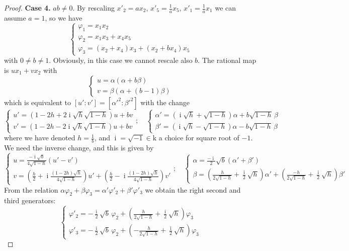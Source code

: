 \documentclass[10pt,reqno]{amsart}
\newcommand{\ii}{\operatorname{i}}
\renewcommand{\a}{\alpha}
\renewcommand{\b}{\beta}
\newcommand{\f}{\varphi}
\newcommand{\kk}{\mathrm{k}}
\theoremstyle{definition}
\begin{document}
\begin{proof}
\noindent \textbf{Case 4.} $ab\ne 0$. By rescaling $x'_2=a x_2$, $x'_5=\frac1a x_5$, $x'_1=\frac1ax_1$ we can assume $a=1$, so we have
\[
\begin{cases}
    \f_1=x_1x_2 \\
    \f_2=x_1x_3+x_4x_5 \\
    \f_3=(x_2+x_4)x_3+(x_2+bx_4)x_5
\end{cases}
\]
with $0 \ne b \ne 1$. Obviously, in this case we cannot rescale also $b$. The rational map is $ux_1+vx_2$ with 
\[
\begin{cases}
    u=\a (\a + b \b) \\
    v=\b(\a+(b-1)\b)
\end{cases}
\]
which is equivalent to $[u':v']=[\a'^2:\b'^2]$ with the change
\[
\begin{cases}
    u'=(1-2h+2 \ii \sqrt{h}\sqrt{1-h})u + b v \\
    v'=(1-2h-2 \ii \sqrt{h}\sqrt{1-h})u + b v
\end{cases} 
; \quad
\begin{cases}
    \a'=( \ii \sqrt{h} + \sqrt{1-h})\a + b\sqrt{1-h} \, \b \\
    \b'=( \ii \sqrt{h} - \sqrt{1-h})\a - b\sqrt{1-h} \, \b
\end{cases} 
\]
where we have denoted $h=\frac1b$, and $\ii=\sqrt{-1} \in \kk$ a choice for square root of $-1$. We need the inverse change, and this is given by
\[
\begin{cases}
    u=\tfrac{-\ii \sqrt{b}}{4 \sqrt{1-h}}(u'-v')  \\ 
    v=\left(\frac h2 + \ii \tfrac{(1-2h)\sqrt{h}}{4 \sqrt{1-h}}\right)u' + \left(\frac h2 - \ii \tfrac{(1-2h)\sqrt{h}}{4 \sqrt{1-h}}\right) v'
\end{cases} 
; \quad
\begin{cases}
    \a=\tfrac{-\ii}{2} \sqrt{b}(\a'+\b') \\
    \b=(\frac{h}{2\sqrt{1-h}} + \frac{\ii}{2} \sqrt{h})\a' + (\frac{-h}{2\sqrt{1-h}} + \frac{\ii}{2} \sqrt{h}) \b'
\end{cases} 
\]
From the relation $\a \f_2+ \b \f_3= \a' \f'_2 + \b' \f'_3$ we obtain the right second and third generators:
\[
\begin{cases}
    \f'_2=-\tfrac{\ii}{2}  \sqrt{b} \, \f_2 + \left(\frac{h}{2\sqrt{1-h}} + \frac{\ii}{2} \sqrt{h}\right) \f_3
    \\
    \f'_3=-\tfrac{\ii}{2}  \sqrt{b} \, \f_2 + \left(-\frac{h}{2\sqrt{1-h}} + \frac{\ii}{2} \sqrt{h} \right) \f_3
\end{cases} 
\]
\end{proof}
\end{document}
